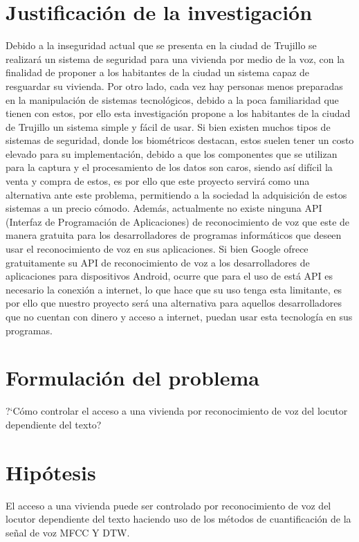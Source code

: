 \section{Justificación de la investigación}
Debido a la inseguridad actual que se presenta en la ciudad de Trujillo se realizará un sistema de seguridad para una vivienda por medio de la voz, con la finalidad de proponer a los habitantes de la ciudad un sistema capaz de resguardar su vivienda.
\vskip 0.5cm
Por otro lado, cada vez hay personas menos preparadas en la manipulación de sistemas tecnológicos, debido a la poca familiaridad que tienen con estos, por ello esta investigación propone a los habitantes de la ciudad de Trujillo un sistema simple y fácil de usar.
\vskip 0.5cm
Si bien existen muchos tipos de sistemas de seguridad, donde los biométricos destacan, estos suelen tener un costo elevado para su implementación, debido a que los componentes que se utilizan para la captura y el procesamiento de los datos son caros, siendo así difícil la venta y compra de estos, es por ello que este proyecto servirá como una alternativa ante este problema, permitiendo a la sociedad la adquisición de estos sistemas a un precio cómodo.
\vskip 0.5cm
Además, actualmente no existe ninguna API (Interfaz de Programación de Aplicaciones) de reconocimiento de voz que este de manera gratuita para los desarrolladores de programas informáticos que deseen usar el reconocimiento de voz en sus aplicaciones. Si bien Google ofrece gratuitamente su API de reconocimiento de voz a los desarrolladores de aplicaciones para dispositivos Android, ocurre que para el uso de está API es necesario la conexión a internet, lo que hace que su uso tenga esta limitante, es por ello que nuestro proyecto será una alternativa para aquellos desarrolladores que no cuentan con dinero y acceso a internet, puedan usar esta tecnología en sus programas.

\section{Formulación del problema}
\begin{center} 
	?`Cómo controlar el acceso a una vivienda por reconocimiento de voz del locutor dependiente del texto?
\end{center}

\section{Hipótesis}
El acceso a una vivienda puede ser controlado por reconocimiento de voz del locutor dependiente del texto haciendo uso de los métodos de cuantificación de la señal de voz MFCC Y DTW.

